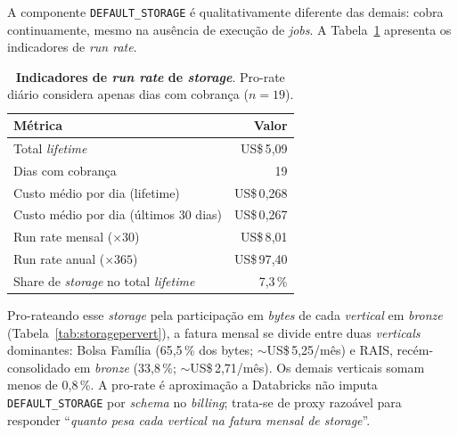 \documentclass[12pt,a4paper,oneside]{article}
\newcommand{\us}{US\$\,}
\begin{document}
A componente \texttt{DEFAULT\_STORAGE} é qualitativamente diferente
das demais: cobra continuamente, mesmo na ausência de execução de
\textit{jobs}. A Tabela~\ref{tab:storage} apresenta os indicadores
de \textit{run rate}.

\begin{table}[H]
\centering
\caption{\textbf{Indicadores de \textit{run rate} de \textit{storage}}.
        Pro-rate diário considera apenas dias com cobrança
        ($n = 19$).}
\label{tab:storage}
\begin{tabular}{lr}
\toprule
\textbf{Métrica}                                   & \textbf{Valor} \\
\midrule
Total \textit{lifetime}                            & \us 5{,}09 \\
Dias com cobrança                                  & 19 \\
Custo médio por dia (lifetime)                     & \us 0{,}268 \\
Custo médio por dia (últimos 30 dias)              & \us 0{,}267 \\
Run rate mensal (\(\times 30\))                    & \us 8{,}01 \\
Run rate anual (\(\times 365\))                    & \us 97{,}40 \\
Share de \textit{storage} no total \textit{lifetime} & 7,3\,\% \\
\bottomrule
\end{tabular}
\end{table}

Pro-rateando esse \textit{storage} pela participação em
\textit{bytes} de cada \textit{vertical} em \textit{bronze}
(Tabela~\ref{tab:storagepervert}), a fatura mensal se divide entre
duas \textit{verticals} dominantes: Bolsa Família (65,5\,\% dos
bytes; \(\sim\)\us 5{,}25/mês) e RAIS, recém-consolidado em
\textit{bronze} (33,8\,\%; \(\sim\)\us 2{,}71/mês). Os demais
verticais somam menos de 0,8\,\%. A pro-rate é
aproximação \textemdash{} a Databricks não imputa
\texttt{DEFAULT\_STORAGE} por \textit{schema} no \textit{billing};
trata-se de proxy razoável para responder ``\textit{quanto pesa cada
vertical na fatura mensal de storage}''.
\end{document}
